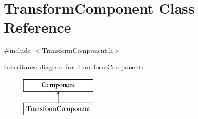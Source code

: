 \hypertarget{class_transform_component}{}\section{Transform\+Component Class Reference}
\label{class_transform_component}


{\ttfamily \#include $<$Transform\+Component.\+h$>$}

Inheritance diagram for Transform\+Component\+:\begin{figure}[H]
\begin{center}
\leavevmode
\includegraphics[height=2.000000cm]{class_transform_component}
\end{center}
\end{figure}

